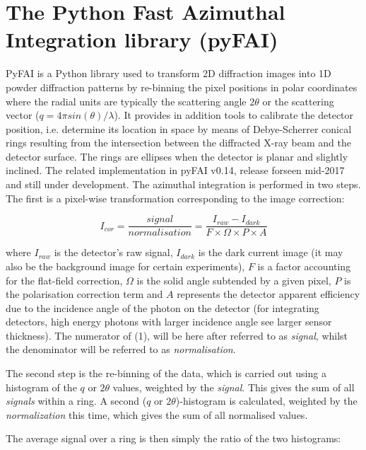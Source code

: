 \documentclass[preprint, pdf]{iucr}              %
\begin{document}
\section{The Python Fast Azimuthal Integration library (pyFAI)}

PyFAI is a Python \cite{python} library used to transform 2D diffraction images into
1D powder diffraction patterns by re-binning the pixel positions in polar
coordinates where the radial units are typically the scattering angle
$2\theta$ or the scattering vector ($q=4\pi sin(\theta)/\lambda$).
It provides in addition tools to calibrate the detector position, i.e. determine
its location in space by means of Debye-Scherrer conical rings resulting from
the intersection between the diffracted X-ray beam and the detector
surface. The rings are ellipses when the detector is planar and slightly
inclined.
The related implementation in pyFAI v0.14, release forseen mid-2017 and still
under development. 
The azimuthal integration is performed in two steps. 
The first is a pixel-wise
transformation corresponding to the image correction:

\begin{equation}
I_{cor} = \frac{signal}{normalisation}  = \frac{I_{raw} - I_{dark}}{F \times
\Omega \times P \times A } 
\end{equation}

where $I_{raw}$ is the detector's raw signal, $I_{dark}$ is the dark current
image (it may also be the background image for certain experiments), $F$ is a 
factor accounting for the flat-field correction, $\Omega$ is the solid
angle subtended by a given pixel, $P$ is the polarisation correction term
and $A$ represents the detector apparent efficiency due to the incidence angle
of the photon on the detector (for integrating detectors, high energy
photons with larger incidence angle see larger sensor thickness).
The numerator of (1), will be here after referred to as
\textit{signal}, whilst the denominator will be referred to as
\textit{normalisation}.

The second step is the re-binning of the data, which is carried out 
using a histogram of the $q$ or $2\theta$ values, weighted by the
\textit{signal}.
This gives the sum of all \textit{signals} within a ring.
A second ($q$ or $2\theta$)-histogram is calculated, weighted
by the \textit{normalization} this time, which gives the sum of all
normalised values.

The average signal over a ring is then simply the ratio of the two histograms:
\end{document}

